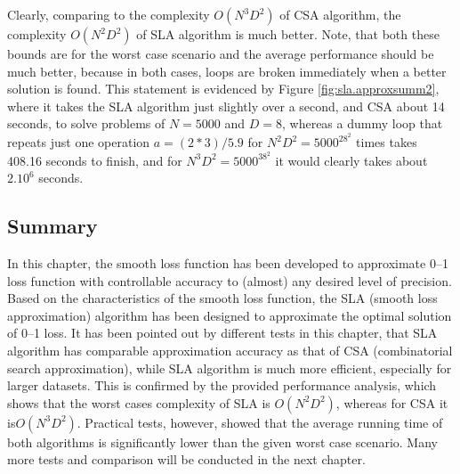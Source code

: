 Clearly, comparing to the complexity $O(N^3D^2)$ of CSA algorithm, the complexity $O(N^2D^2)$ of SLA algorithm is much better. Note, that both these bounds are for the worst case scenario and the average performance should be much better, because in both cases, loops are broken immediately when a better solution is found. This statement is evidenced by Figure \ref{fig:sla.approxsumm2}, where it takes the SLA algorithm just slightly over a second, and CSA about 14 seconds, to solve problems of $N=5000$ and $D=8$, whereas a dummy loop that repeats just one operation $a = (2*3)/5.9$ for $N^2D^2 = 5000^28^2$ times takes 408.16 seconds to finish, and for $N^3D^2 = 5000^38^2$ it would clearly takes about $2.10^6$ seconds.


\subsection{Summary}
\label{sec:sla.summaryl}

In this chapter, the smooth loss function has been developed to approximate 0--1 loss function with controllable accuracy to (almost) any desired level of precision. Based on the characteristics of the smooth loss function, the SLA (smooth loss approximation) algorithm has been designed to approximate the optimal solution of 0--1 loss. It has been pointed out by different tests in this chapter, that SLA algorithm has comparable approximation accuracy as that of CSA (combinatorial search approximation), while SLA algorithm is much more efficient, especially for larger datasets. This is confirmed by the provided performance analysis, which shows that the worst cases complexity of SLA is $O(N^2D^2)$, whereas for CSA it is$O(N^3D^2)$. Practical tests, however, showed that the average running time of both algorithms is significantly lower than the given worst case scenario. Many more tests and comparison will be conducted in the next chapter. 

